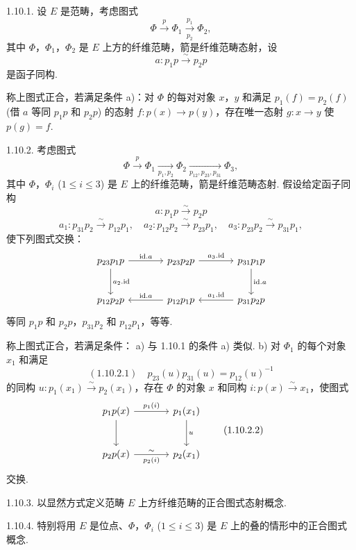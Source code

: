 \begin{definition}\label{def:XIII.1.10}
1.10.1. 设 $E$ 是范畴，考虑图式
\[
\Phi \xrightarrow{p} \Phi_1 \xrightarrow[p_2]{p_1} \Phi_2,
\]
其中 $\Phi$，$\Phi_1$，$\Phi_2$ 是 $E$ 上方的纤维范畴，箭是纤维范畴态射，设
\[
a \colon p_1 p \xrightarrow{\sim} p_2 p
\]
是函子同构.

称上图式正合，若满足条件 a)：对 $\Phi$ 的每对对象 $x$，$y$ 和满足 $p_1(f) = p_2(f)$ (借 $a$ 等同 $p_1 p$ 和 $p_2 p$) 的态射 $f \colon p(x) \to p(y)$，存在唯一态射 $g \colon x \to y$ 使 $p(g) = f$.

1.10.2. 考虑图式
\[
\Phi \xrightarrow{p} \Phi_1 \xrightarrow[p_1, p_2]{} \Phi_2 \xrightarrow[p_{12}, p_{23}, p_{31}]{} \Phi_3,
\]
其中 $\Phi$，$\Phi_i$ ($1 \leqslant i \leqslant 3$) 是 $E$ 上的纤维范畴，箭是纤维范畴态射. 假设给定函子同构
\[
a \colon p_1 p \xrightarrow{\sim} p_2 p
\]
\[
a_1 \colon p_{31} p_2 \xrightarrow{\sim} p_{12} p_1, \quad a_2 \colon p_{12} p_2 \xrightarrow{\sim} p_{23} p_1, \quad a_3 \colon p_{23} p_2 \xrightarrow{\sim} p_{31} p_1,
\]
使下列图式交换：
\[
\begin{tikzcd}[row sep=large, column sep=large]
p_{23} p_1 p \arrow[r,"{\mathrm{id}.a}"] \arrow[d,"{a_2 . \mathrm{id}}"] & p_{23} p_2 p \arrow[r,"{a_3 . \mathrm{id}}"] & p_{31} p_1 p \arrow[d,"{\mathrm{id}.a}"] \\
p_{12} p_2 p & p_{12} p_1 p \arrow[l,"{\mathrm{id}.a}"'] & p_{31} p_2 p \arrow[l,"{a_1 . \mathrm{id}}"']
\end{tikzcd}
\]
等同 $p_1 p$ 和 $p_2 p$，$p_{31} p_2$ 和 $p_{12} p_1$，等等.

称上图式正合，若满足条件：
a) 与 1.10.1 的条件 a) 类似.
b) 对 $\Phi_1$ 的每个对象 $x_1$ 和满足
\[
(1.10.2.1) \quad p_{23}(u) p_{31}(u) = p_{12}(u)^{-1}
\]
的同构 $u \colon p_1(x_1) \xrightarrow{\sim} p_2(x_1)$，存在 $\Phi$ 的对象 $x$ 和同构 $i \colon p(x) \xrightarrow{\sim} x_1$，使图式
\begin{equation}
\begin{tikzcd}[row sep=large, column sep=large]
p_1 p(x) \arrow[r,"{p_1(i)}"] \arrow[d] & p_1(x_1) \arrow[d,"{u}"] \\
p_2 p(x) \arrow[r,"{\sim}","{p_2(i)}"'] & p_2(x_1)
\end{tikzcd}
\tag{1.10.2.2}
\label{eq:XIII.1.10.2.2}
\end{equation}
交换.
\end{definition}

1.10.3. 以显然方式定义范畴 $E$ 上方纤维范畴的正合图式态射概念.

1.10.4. 特别将用 $E$ 是位点、$\Phi$，$\Phi_i$ ($1 \leqslant i \leqslant 3$) 是 $E$ 上的叠的情形中的正合图式概念.

